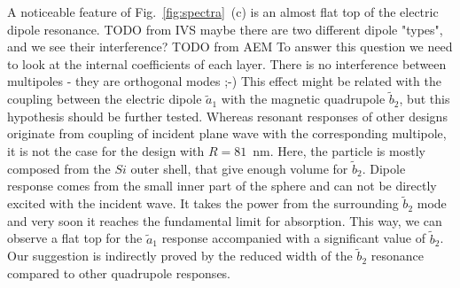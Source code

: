 \documentclass[aps,prl,twocolumn,showpacs,superscriptaddress,groupedaddress]{revtex4-1}
\begin{document}
A noticeable feature of Fig.~\ref{fig:spectra}~(c) is an almost flat
top of the electric dipole resonance.  TODO from IVS maybe there are
two different dipole "types", and we see their interference?  TODO
from AEM To answer this question we need to look at the internal
coefficients of each layer.  There is no interference between
multipoles - they are orthogonal modes ;-)
This effect might be related with the coupling between the electric
dipole $\tilde{a}_1$ with the magnetic quadrupole $\tilde{b}_2$, but
this hypothesis should be further tested.  Whereas resonant responses
of other designs originate from coupling of incident plane wave with
the corresponding multipole, it is not the case for the design with
$R=81$~nm. Here, the particle is mostly composed from the $Si$ outer
shell, that give enough volume for $\tilde{b}_2$.  Dipole response
comes from the small inner part of the sphere and can not be directly
excited with the incident wave.  It takes the power from the
surrounding $\tilde{b}_2$ mode and very soon it reaches the
fundamental limit for absorption.  This way, we can observe a flat top
for the $\tilde{a}_1$ response accompanied with a significant value of
$\tilde{b}_2$.  Our suggestion is indirectly proved by the reduced
width of the $\tilde{b}_2$ resonance compared to other quadrupole
responses.
\end{document}

